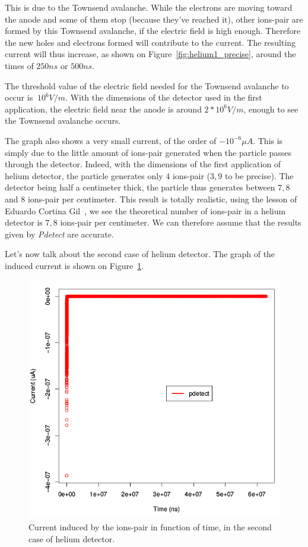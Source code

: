 \documentclass[11pt]{article}
\begin{document}
				This is due to the Townsend avalanche. While the electrons are moving toward the anode and some of them stop
				(because they've reached it), other ions-pair are formed by this Townsend avalanche, if the electric field is
				high enough. Therefore the new holes and electrons formed will contribute to the current. The resulting current
				will thus increase, as shown on Figure~\ref{fig:helium1_precise}, around the times of $250ns$ or $500ns$.

				The threshold value of the electric field needed for the Townsend avalanche to occur is $~10^6V/m$. With the
				dimensions of the detector used in the first application, the electric field near the anode is around
				$2*10^6V/m$, enough to see the Townsend avalanche occurs.

				The graph also shows a very small current, of the order of $-10^{-6}\mu A$. This is simply due to the little
				amount of ions-pair generated when the particle passes through the detector. Indeed, with the dimensions of the
				first application of helium detector, the particle generates only $4$ ions-pair ($3,9$ to be precise). The detector
				being half a centimeter thick, the particle thus generates between $7,8$ and $8$ ions-pair per centimeter.
				This result is totally realistic, using the lesson of Eduardo Cortina Gil~\cite{lphy2236}, we see the theoretical
				number of ions-pair in a helium detector is $7,8$ ions-pair per centimeter. We can therefore assume that the
				results given by \textit{Pdetect} are accurate.

				Let's now talk about the second case of helium detector. The graph of the induced current is shown on
				Figure~\ref{fig:helium2_unprecise}.

				\begin{figure}[H]
				  \center
				  \includegraphics[scale=0.4]{images/applications/helium2_unprecise.png}
				  \caption{Current induced by the ions-pair in function of time, in the second case of helium detector.}
				  \label{fig:helium2_unprecise}
				\end{figure}
\end{document}
